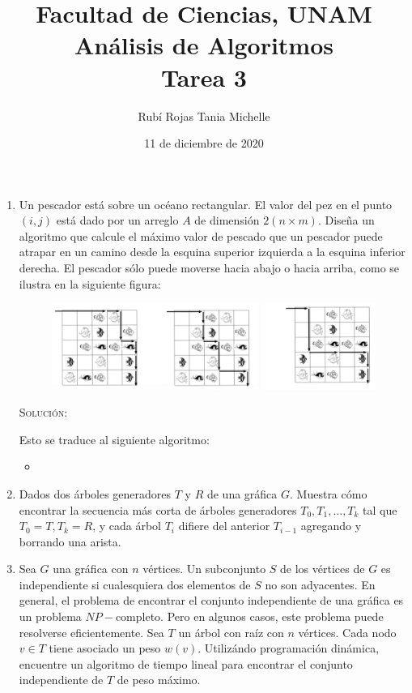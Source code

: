 \documentclass[letterpaper,11pt]{article}
\title{Facultad de Ciencias, UNAM \\ 
       Análisis de Algoritmos \\ 
       Tarea 3}
\author{Rubí Rojas Tania Michelle}
\date{11 de diciembre de 2020}
\begin{document}
\maketitle

\begin{enumerate}
    \item Un pescador está sobre un océano rectangular. El valor del pez en el 
    punto $(i, j)$ está dado por un arreglo $A$ de dimensión $2 (n \times m)$.
    Diseña un algoritmo que calcule el máximo valor de pescado que un pescador
    puede atrapar en un camino desde la esquina superior izquierda a la esquina 
    inferior derecha. El pescador sólo puede moverse hacia abajo o hacia arriba,
    como se ilustra en la siguiente figura: 
    \begin{figure}[h]
        \centering
        \includegraphics[width=0.5\linewidth]{imagenes/ejercicio1.png}
    \end{figure}

    \textsc{Solución:}

    Esto se traduce al siguiente algoritmo:
    \begin{itemize}
        \item 
    \end{itemize}

    \item Dados dos árboles generadores $T$ y $R$ de una gráfica $G$. Muestra 
    cómo encontrar la secuencia más corta de árboles generadores $T_0, T_1, 
    \ldots, T_k$ tal que $T_0 = T, T_k = R$, y cada árbol $T_i$ difiere del 
    anterior $T_{i-1}$ agregando y borrando una arista.

    \item Sea $G$ una gráfica con $n$ vértices. Un subconjunto $S$ de los 
    vértices de $G$ es independiente si cualesquiera dos elementos de $S$ no 
    son adyacentes. En general, el problema de encontrar el conjunto 
    independiente de una gráfica es un problema $NP-$completo. Pero en 
    algunos casos, este problema puede resolverse eficientemente. Sea $T$ un
    árbol con raíz con $n$ vértices. Cada nodo $v \in T$ tiene asociado un peso 
    $w(v)$. Utilizándo programación dinámica, encuentre un algoritmo de tiempo 
    lineal para encontrar el conjunto independiente de $T$ de peso máximo.


\end{enumerate}
\end{document}

